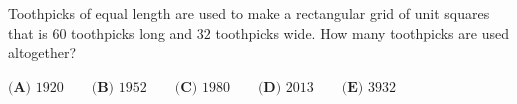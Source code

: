 Toothpicks of equal length are used to make a rectangular grid of unit squares that is $60$ toothpicks long and $32$ toothpicks wide. How many toothpicks are used altogether?

$\textbf{(A) }1920\qquad\textbf{(B) }1952\qquad\textbf{(C) }1980\qquad\textbf{(D) }2013\qquad\textbf{(E) }3932$
